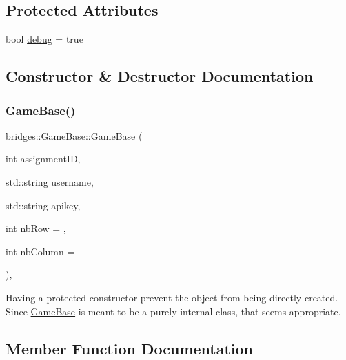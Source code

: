 \subsection*{Protected Attributes}
\begin{DoxyCompactItemize}
\item 
bool \hyperlink{classbridges_1_1_game_base_a5db5d0838bee9722fc90465166c55d26}{debug} = true
\end{DoxyCompactItemize}


\subsection{Constructor \& Destructor Documentation}
\mbox{\label{classbridges_1_1_game_base_ab10dc09af0e332770d214f822040f977}} 
\subsubsection{\texorpdfstring{Game\+Base()}{GameBase()}}
{\footnotesize\ttfamily bridges\+::\+Game\+Base\+::\+Game\+Base (\begin{DoxyParamCaption}\item[{int}]{assignment\+ID,  }\item[{std\+::string}]{username,  }\item[{std\+::string}]{apikey,  }\item[{int}]{nb\+Row = {},  }\item[{int}]{nb\+Column = {} }\end{DoxyParamCaption})\hspace{0.3cm}{\ttfamily [inline]}, {\ttfamily [protected]}}

Having a protected constructor prevent the object from being directly created. Since \hyperlink{classbridges_1_1_game_base}{Game\+Base} is meant to be a purely internal class, that seems appropriate. 

\subsection{Member Function Documentation}
\mbox{\label{classbridges_1_1_game_base_aca81c3d696ee509f2f95546fcd328202}} 
